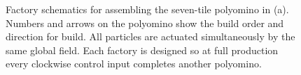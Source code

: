 \begin{figure}
\centering
{}\par
{}\par        
{}
\caption{Factory schematics for assembling the seven-tile polyomino in (a).  Numbers and arrows on the polyomino show the build order and direction for build. All particles are actuated simultaneously by the same global field. Each factory is designed so at full production every clockwise control input completes another polyomino.}
\label{TS}
\end{figure}





